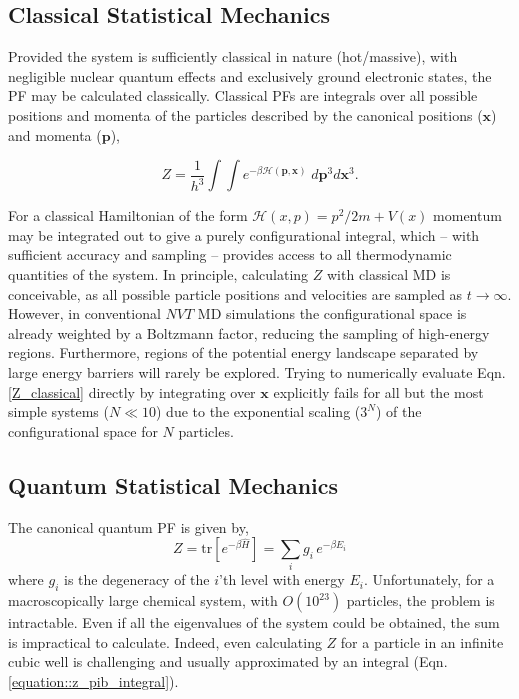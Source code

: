 \documentclass[../main.tex]{subfiles}
\begin{document}
\subsection{Classical Statistical Mechanics}

Provided the system is sufficiently classical in nature (hot/massive), with negligible nuclear quantum effects and exclusively ground electronic states, the PF may be calculated classically. Classical PFs are integrals over all possible positions and momenta of the particles described by the canonical positions ($\boldsymbol{x}$) and momenta ($\boldsymbol{p}$),\cite{mcquarrie200}

\begin{equation}
	Z = \frac{1}{h^{3}}\int\int e^{-\beta \mathcal{H}(\boldsymbol{p}, \boldsymbol{x})} \; d\boldsymbol{p}^{3} d\boldsymbol{x}^{3}.
	\label{Z_classical}
\end{equation}

For a classical Hamiltonian of the form $\mathcal{H}(x, p) = p^2/2m + V(x)$ momentum may be integrated out to give a purely configurational integral, which -- with sufficient accuracy and sampling -- provides access to all thermodynamic quantities of the system. In principle, calculating $Z$ with classical MD is conceivable, as all possible particle positions and velocities are sampled as $t \rightarrow \infty$. However, in conventional $NVT$ MD simulations the configurational space is already weighted by a Boltzmann factor, reducing the sampling of high-energy regions. Furthermore, regions of the potential energy landscape separated by large energy barriers will rarely be explored. Trying to numerically evaluate Eqn. \eqref{Z_classical} directly by integrating over $\boldsymbol{x}$ explicitly fails for all but the most simple systems ($N \ll 10$) due to the exponential scaling ($3^{N}$) of the configurational space for $N$ particles.



\subsection{Quantum Statistical Mechanics}

The canonical quantum PF is given by,
\begin{equation}
Z = \text{tr}[e^{-\beta \hat{H}}]  = \sum_i g_i \, e^{-\beta E_i}
\label{caonical_pf}
\end{equation}
where $g_i$ is the degeneracy of the $i$'th level with energy $E_i$. Unfortunately, for a macroscopically large chemical system, with $O(10^{23})$ particles, the problem is intractable. Even if all the eigenvalues of the system could be obtained, the sum is impractical to calculate. Indeed, even calculating $Z$ for a particle in an infinite cubic well is challenging and usually approximated by an integral (Eqn. \ref{equation::z_pib_integral}).
\end{document}
